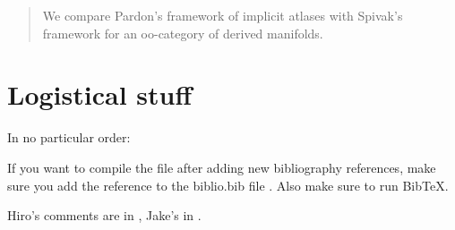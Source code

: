 \documentclass[12pt]{article}
\title{}
\author{Jacob McNamara and Hiro Lee Tanaka}
\theoremstyle{definition}
\begin{document}
\maketitle

\begin{abstract}
We compare Pardon's framework of implicit atlases with Spivak's framework for an oo-category of derived manifolds.
\end{abstract}

\section{Logistical stuff}
In no particular order:
\enum
	\item
		If you want to compile the file after adding new bibliography references, make sure you add the reference to the biblio.bib file . Also make sure to run BibTeX.
	\item
		Hiro's comments are in , Jake's in .
\enumd









\end{document}
